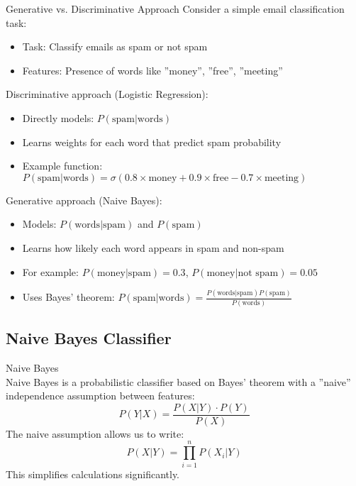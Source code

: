 \begin{example2}{Generative vs. Discriminative Approach}
Consider a simple email classification task:
\begin{itemize}
    \item Task: Classify emails as spam or not spam
    \item Features: Presence of words like ''money'', ''free'', ''meeting''
\end{itemize}
\tcblower
Discriminative approach (Logistic Regression):
\begin{itemize}
    \item Directly models: $P(\text{spam}|\text{words})$
    \item Learns weights for each word that predict spam probability
    \item Example function: $P(\text{spam}|\text{words}) = \sigma(0.8 \times \text{money} + 0.9 \times \text{free} - 0.7 \times \text{meeting})$
\end{itemize}

Generative approach (Naive Bayes):
\begin{itemize}
    \item Models: $P(\text{words}|\text{spam})$ and $P(\text{spam})$
    \item Learns how likely each word appears in spam and non-spam
    \item For example: $P(\text{money}|\text{spam}) = 0.3$, $P(\text{money}|\text{not spam}) = 0.05$
    \item Uses Bayes' theorem: $P(\text{spam}|\text{words}) = \frac{P(\text{words}|\text{spam})P(\text{spam})}{P(\text{words})}$
\end{itemize}
\end{example2}

\raggedcolumns
\columnbreak

\subsection{Naive Bayes Classifier}


\begin{definition}{Naive Bayes}\\
Naive Bayes is a probabilistic classifier based on Bayes' theorem with a ''naive'' independence assumption between features:
\[P(Y|X) = \frac{P(X|Y) \cdot P(Y)}{P(X)}\]
The naive assumption allows us to write:
\[P(X|Y) = \prod_{i=1}^{n} P(X_i|Y)\]
This simplifies calculations significantly.
\end{definition}

